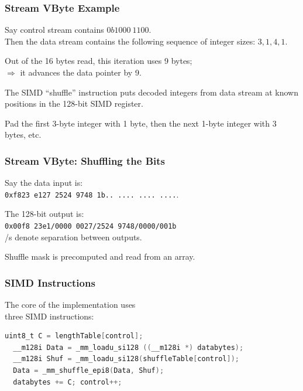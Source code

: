 \begin{frame}
\frametitle{Stream VByte Example}

\large\begin{changemargin}{2cm}
Say control stream contains $0b1000~1100$. \\
Then the data stream
contains the following sequence of integer sizes: $3, 1, 4, 1$. 

Out of the 16 bytes read,
this iteration uses 9 bytes; \\
\hspace*{2em} $\Rightarrow$ it advances the data pointer by 9. 

The SIMD
``shuffle'' instruction puts decoded integers from data stream at known positions in the
128-bit SIMD register.

Pad the first 3-byte integer with 1 byte, then
the next 1-byte integer with 3 bytes, etc. 
\end{changemargin}
\end{frame}

\begin{frame}
\frametitle{Stream VByte: Shuffling the Bits}
\vspace*{-1em}
\large\begin{changemargin}{1cm}
Say the data input is:\\
{\tt 0xf823~e127~2524~9748~1b..~....~....~....}. 

The 128-bit output is:\\
{\tt 0x00f8~23e1/0000~0027/2524 9748/0000/001b}\\
/s denote separation
between outputs. 

Shuffle mask is precomputed and
read from an array.
\end{changemargin}
\end{frame}

\begin{frame}[fragile]
\frametitle{SIMD Instructions}

\vspace*{-1em}
\large\begin{changemargin}{1cm}
The core of the implementation uses\\
three SIMD instructions:
\begin{lstlisting}[language=C]
  uint8_t C = lengthTable[control];
  __m128i Data = _mm_loadu_si128 ((__m128i *) databytes);
  __m128i Shuf = _mm_loadu_si128(shuffleTable[control]);
  Data = _mm_shuffle_epi8(Data, Shuf);
  databytes += C; control++;
\end{lstlisting}
\end{changemargin}
\end{frame}


